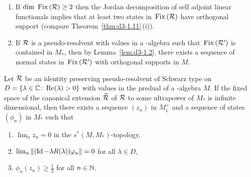 \begin{remark}\label{rem:d4-4.2}
\begin{enumerate}[\upshape (i), wide, labelindent=.25em]
\item
If\/ $ \dim \Fix{\RR} \geq 2 $  then the Jordan decomposition of self adjoint linear functionals implies that at least two states in $ \mathop{}\mathrm{Fix}\left(\mathcal{R}\right) $  have orthogonal support (compare Theorem~\ref{thm:d3-1.11}\,(i)).

\item
If\/ $ \mathcal{R} $  is a pseudo-resolvent with values in a \WA-algebra such that $ \mathop{}\mathrm{Fix}\left(\mathcal{R}'\right) $  is contained in $ M_{*} $,  then by Lemma~\ref{lem:d3-1.2}, there exists a sequence of normal states in $ \mathop{}\mathrm{Fix}\left(\mathcal{R}'\right) $  with orthogonal supports in $ M $.
\end{enumerate}
\end{remark}
\begin{lemma}\label{lem:d4-4.3}
Let $ \mathcal{R} $  be an identity preserving pseudo-resolvent of Schwarz type on $ D = \{\lambda \in \mathbb{C} \colon  \mathop{}\!\mathrm{Re}(\lambda) > 0\} $  with values in the predual of a \WA-algebra $ M $.
If the fixed space of the canonical extension $ \widehat{\mathcal{R}} $  of\/ $ \mathcal{R} $  to some ultrapower of\/ $ M_{*} $  is infinite dimensional, then there exists a sequence $ (z_{n}) $  in $ M_{1}^{+} $  and a sequence of states $ (\phi_{n}) $  in $ M_{*} $  such that
\begin{enumerate}[\upshape (i)]

\item\label{item:d4-4.3-i}
$ \lim_{n} z_{n} = 0 $  in the $ s^{*}(M,M_{*}) $-topology,

\item\label{item:d4-4.3-ii}
$ \lim_{n} \|(\Id - \lambda R(\lambda))\phi_{n}\| = 0 $  for all $ \lambda \in D $,

\item\label{item:d4-4.3-iii}
$ \phi_{n}(z_{n}) \geq \frac{1}{2} $  for all $ n \in \mathbb{N} $. 
\end{enumerate}
\end{lemma}
